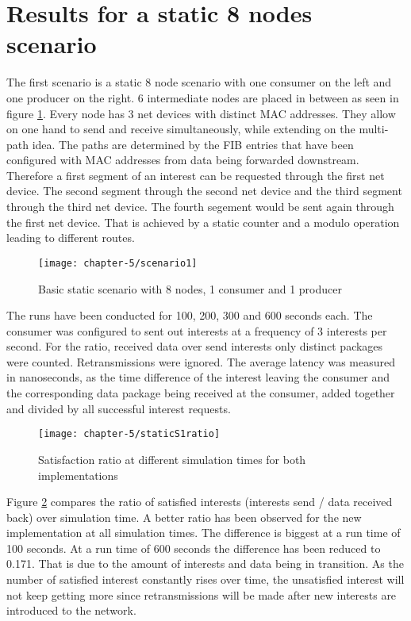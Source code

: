 \section{Results for a static 8 nodes scenario}

The first scenario is a static 8 node scenario with one consumer on the left and one producer on the right. 6 intermediate nodes are placed in between as seen in figure \ref{fig:scenario1}. Every node has 3 net devices with distinct MAC addresses. They allow on one hand to send and receive simultaneously, while extending on the multi-path idea. The paths are determined by the FIB entries that have been configured with MAC addresses from data being forwarded downstream. Therefore a first segment of an interest can be requested through the first net device. The second segment through the second net device and the third segment through the third net device. The fourth segement would be sent again through the first net device. That is achieved by a static counter and a modulo operation leading to different routes.

\begin{figure}[H]
  \centering
  \texttt{[image: chapter-5/scenario1]}
  \caption{Basic static scenario with 8 nodes, 1 consumer and 1 producer}
  \label{fig:scenario1}
\end{figure}

The runs have been conducted for 100, 200, 300 and 600 seconds each. The consumer was configured to sent out interests at a frequency of 3 interests per second. For the ratio, received data over send interests only distinct packages were counted. Retransmissions were ignored. The average latency was measured in nanoseconds, as the time difference of the interest leaving the consumer and the corresponding data package being received at the consumer, added together and divided by all successful interest requests.

\begin{figure}[H]
  \centering
  \texttt{[image: chapter-5/staticS1ratio]}
  \caption{Satisfaction ratio at different simulation times for both implementations}
  \label{fig:staticS1ratio}
\end{figure}

Figure \ref{fig:staticS1ratio} compares the ratio of satisfied interests (interests send / data received back) over simulation time. A better ratio has been observed for the new implementation at all simulation times. The difference is biggest at a run time of 100 seconds. At a run time of 600 seconds the difference has been reduced to 0.171. That is due to the amount of interests and data being in transition. As the number of satisfied interest constantly rises over time, the unsatisfied interest will not keep getting more since retransmissions will be made after new interests are introduced to the network.

